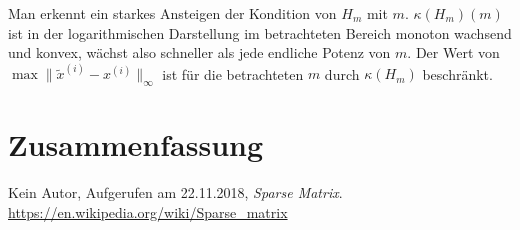 \documentclass[smallheadings]{scrartcl}
\numberwithin{equation}{section}
\begin{document}
Man erkennt ein starkes Ansteigen der Kondition von $H_m$ mit $m$. $\kappa(H_m)(m)$ ist in der logarithmischen Darstellung im betrachteten Bereich monoton wachsend und konvex, wächst also schneller als jede endliche Potenz von $m$. Der Wert von $\max\|\tilde{x}^{(i)}-x^{(i)}\|_\infty$ ist für die betrachteten $m$ durch $\kappa(H_m)$ beschränkt.

\section{Zusammenfassung}


\begin{thebibliography}{9}
 Kein Autor, Aufgerufen am 22.11.2018, \textit{Sparse Matrix}. 
\url{https://en.wikipedia.org/wiki/Sparse_matrix}
\end{thebibliography}


\end{document}
